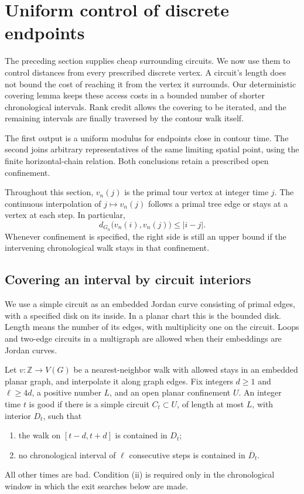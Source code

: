 \section{Uniform control of discrete endpoints}
\label{spike:section}

The preceding section supplies cheap surrounding circuits.  We now use
them to control distances from every prescribed discrete vertex.  A
circuit's length does not bound the cost of reaching it from the vertex
it surrounds.  Our deterministic covering lemma keeps these access costs
in a bounded number of shorter chronological intervals.  Rank credit
allows the covering to be iterated, and the remaining intervals are
finally traversed by the contour walk itself.

The first output is a uniform modulus for endpoints close in contour
time.  The second joins arbitrary representatives of the same limiting
spatial point, using the finite horizontal-chain relation.  Both
conclusions retain a prescribed open confinement.

Throughout this section, $v_n(j)$ is the primal tour vertex at integer time
$j$.  The continuous interpolation of $j\mapsto v_n(j)$ follows a primal
tree edge or stays at a vertex at each step.  In particular,
\begin{equation}\label{spike:chronological-bound}
 d_{G_n}\bigl(v_n(i),v_n(j)\bigr)\le |i-j|.
\end{equation}
Whenever confinement is specified, the right side is still an upper bound
if the intervening chronological walk stays in that confinement.

\subsection{Covering an interval by circuit interiors}

We use a simple circuit as an embedded Jordan curve consisting of primal
edges, with a specified disk on its inside.  In a planar chart this is the
bounded disk.  Length means the number of its edges, with multiplicity one
on the circuit.  Loops and two-edge circuits in a multigraph are allowed
when their embeddings are Jordan curves.

\begin{definition}\label{spike:available}
Let $v:\mathbb Z\to V(G)$ be a nearest-neighbor walk with allowed stays in
an embedded planar graph, and interpolate it along graph edges.  Fix
integers $d\ge1$ and $\ell\ge 4d$, a positive number $L$, and an open
planar confinement $U$.  An integer time $t$ is good if there is a simple
circuit $C_t\subset U$, of length at most $L$, with interior $D_t$, such
that
\begin{enumerate}[label=(\roman*)]
 \item the walk on $[t-d,t+d]$ is contained in $D_t$;
 \item no chronological interval of $\ell$ consecutive steps is
       contained in $\overline D_t$.
\end{enumerate}
All other times are bad.  Condition (ii) is required only in the
chronological window in which the exit searches below are made.
\end{definition}

